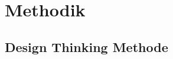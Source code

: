 \newpage

\section{Methodik} \label{anwendung}
\subsection{Design Thinking Methode} \label{design_thinking}
